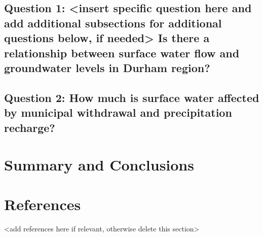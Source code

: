 \documentclass[
  12pt,
]{article}
\begin{document}
\hypertarget{question-1-insert-specific-question-here-and-add-additional-subsections-for-additional-questions-below-if-needed-is-there-a-relationship-between-surface-water-flow-and-groundwater-levels-in-durham-region}{%
\subsection{Question 1: \textless insert specific question here and add
additional subsections for additional questions below, if
needed\textgreater{} Is there a relationship between surface water flow
and groundwater levels in Durham
region?}\label{question-1-insert-specific-question-here-and-add-additional-subsections-for-additional-questions-below-if-needed-is-there-a-relationship-between-surface-water-flow-and-groundwater-levels-in-durham-region}}

\hypertarget{question-2-how-much-is-surface-water-affected-by-municipal-withdrawal-and-precipitation-recharge}{%
\subsection{Question 2: How much is surface water affected by municipal
withdrawal and precipitation
recharge?}\label{question-2-how-much-is-surface-water-affected-by-municipal-withdrawal-and-precipitation-recharge}}

\newpage

\hypertarget{summary-and-conclusions}{%
\section{Summary and Conclusions}\label{summary-and-conclusions}}

\newpage

\hypertarget{references}{%
\section{References}\label{references}}

\textless add references here if relevant, otherwise delete this
section\textgreater{}
\end{document}
